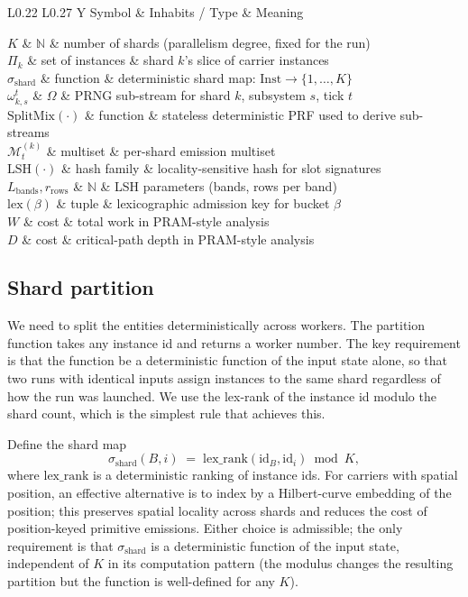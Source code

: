 \documentclass[journal,onecolumn,11pt]{IEEEtran}
\theoremstyle{definition}
\newcommand{\notationtable}[3]{%
  \begin{table}[ht]
  \centering
  \caption{#1}
  \label{#2}
  \small
  \renewcommand{\arraystretch}{1.1}
  \begin{tabularx}{\linewidth}{L{0.22\linewidth} L{0.27\linewidth} Y}
  \toprule
  Symbol & Inhabits / Type & Meaning \\
  \midrule
  #3
  \bottomrule
  \end{tabularx}
  \end{table}%
}
\begin{document}
\notationtable{Symbols introduced in this appendix.}{tab:notation-sldm}{
$K$                       & $\mathbb{N}$                 & number of shards (parallelism degree, fixed for the run) \\
$\Pi_k$                   & set of instances             & shard $k$'s slice of carrier instances \\
$\sigma_{\mathrm{shard}}$ & function                     & deterministic shard map: $\mathrm{Inst} \to \{1,\ldots,K\}$ \\
$\omega^{t}_{k,s}$        & $\Omega$                     & PRNG sub-stream for shard $k$, subsystem $s$, tick $t$ \\
$\mathrm{SplitMix}(\cdot)$ & function                    & stateless deterministic PRF used to derive sub-streams \\
$\mathcal{M}_t^{(k)}$     & multiset                     & per-shard emission multiset \\
$\mathrm{LSH}(\cdot)$     & hash family                  & locality-sensitive hash for slot signatures \\
$L_{\mathrm{bands}}, r_{\mathrm{rows}}$ & $\mathbb{N}$   & LSH parameters (bands, rows per band) \\
$\mathrm{lex}(\beta)$     & tuple                        & lexicographic admission key for bucket $\beta$ \\
$W$                       & cost                         & total work in PRAM-style analysis \\
$D$                       & cost                         & critical-path depth in PRAM-style analysis \\
}

\subsection{Shard partition}

We need to split the entities deterministically across workers. The partition function takes any instance id and returns a worker number. The key requirement is that the function be a deterministic function of the input state alone, so that two runs with identical inputs assign instances to the same shard regardless of how the run was launched. We use the lex-rank of the instance id modulo the shard count, which is the simplest rule that achieves this.

Define the shard map
\[
\sigma_{\mathrm{shard}}(B, i) \;=\; \mathrm{lex\_rank}(\mathrm{id}_B, \mathrm{id}_i) \bmod K,
\]
where $\mathrm{lex\_rank}$ is a deterministic ranking of instance ids. For carriers with spatial position, an effective alternative is to index by a Hilbert-curve embedding of the position; this preserves spatial locality across shards and reduces the cost of position-keyed primitive emissions. Either choice is admissible; the only requirement is that $\sigma_{\mathrm{shard}}$ is a deterministic function of the input state, independent of $K$ in its computation pattern (the modulus changes the resulting partition but the function is well-defined for any $K$).
\end{document}
